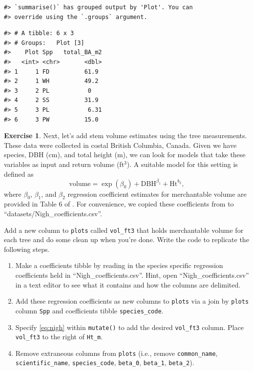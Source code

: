 \documentclass[
  11pt,
]{krantz}
\providecommand{\tightlist}{%
  \setlength{\itemsep}{0pt}\setlength{\parskip}{0pt}}
\theoremstyle{definition}
\theoremstyle{definition}
\theoremstyle{definition}
\newtheorem{exercise}{Exercise}[chapter]
\theoremstyle{definition}
\theoremstyle{remark}
\begin{document}
\begin{verbatim}
#> `summarise()` has grouped output by 'Plot'. You can
#> override using the `.groups` argument.
\end{verbatim}

\begin{verbatim}
#> # A tibble: 6 x 3
#> # Groups:   Plot [3]
#>    Plot Spp   total_BA_m2
#>   <int> <chr>       <dbl>
#> 1     1 FD          61.9 
#> 2     1 WH          49.2 
#> 3     2 PL           0   
#> 4     2 SS          31.9 
#> 5     3 PL           6.31
#> 6     3 PW          15.0
\end{verbatim}

\begin{exercise}
\protect\hypertarget{exr:dplyr21}{}\label{exr:dplyr21}Next, let's add stem volume estimates using the tree measurements. These data were collected in costal British Columbia, Canada. Given we have species, DBH (cm), and total height (m), we can look for models that take these variables as input and return volume (ft\(^3\)). A suitable model for this setting is defined as
\begin{equation}
 \text{volume} = \exp(\beta_0) + \text{DBH}^{\beta_1} + \text{Ht}^{b_2},
 \label{eq:nigh}
\end{equation}
where \(\beta_0\), \(\beta_1\), and \(\beta_2\) regression coefficient estimates for merchantable volume are provided in Table 6 of \citet{Nigh2016}. For convenience, we copied these coefficients from \citet{Nigh2016} to ``datasets/Nigh\_coefficients.csv''.

Add a new column to \texttt{plots} called \texttt{vol\_ft3} that holds merchantable volume for each tree and do some clean up when you're done. Write the code to replicate the following steps.
\end{exercise}

\begin{enumerate}
\def\labelenumi{\arabic{enumi})}
\tightlist
\item
  Make a coefficients tibble by reading in the species specific regression coefficients held in ``Nigh\_coefficients.csv''. Hint, open ``Nigh\_coefficients.csv'' in a text editor to see what it contains and how the columns are delimited.
\item
  Add these regression coefficients as new columns to \texttt{plots} via a join by \texttt{plots} column \texttt{Spp} and coefficients tibble \texttt{species\_code}.
\item
  Specify \eqref{eq:nigh} within \texttt{mutate()} to add the desired \texttt{vol\_ft3} column. Place \texttt{vol\_ft3} to the right of \texttt{Ht\_m}.
\item
  Remove extraneous columns from \texttt{plots} (i.e., remove \texttt{common\_name}, \texttt{scientific\_name}, \texttt{species\_code}, \texttt{beta\_0}, \texttt{beta\_1}, \texttt{beta\_2}).
\end{enumerate}
\end{document}
